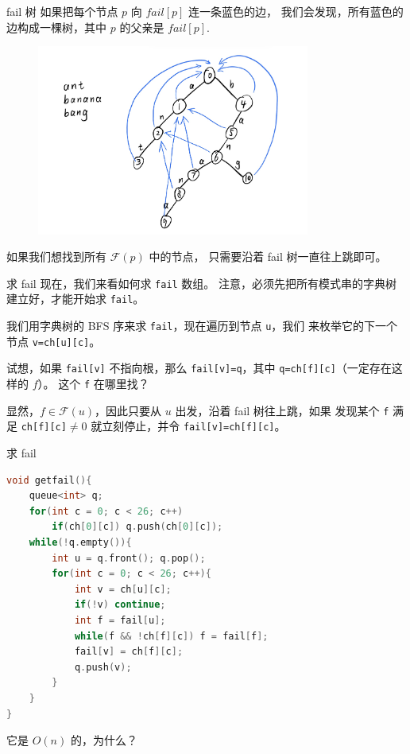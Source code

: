 \documentclass{beamer}
\begin{document}
\begin{frame}[fragile]{fail 树}
    \small
    如果把每个节点 $p$ 向 $fail[p]$ 连一条蓝色的边，
    我们会发现，所有蓝色的边构成一棵树，其中 $p$ 的父亲是 $fail[p]$.

    \begin{figure}[H]
        \centering
        \includegraphics[width=0.8\textwidth]{pic/fail.jpg}
    \end{figure}

    \vspace{1em}\pause
    如果我们想找到所有 $\mathcal{F}(p)$ 中的节点，
    只需要沿着 fail 树一直往上跳即可。
\end{frame}

\begin{frame}[fragile]{求 fail}
    \small
    现在，我们来看如何求 \verb|fail| 数组。
    注意，必须先把所有模式串的字典树建立好，才能开始求 \verb|fail|。

    \vspace{1em}\pause
    我们用字典树的 BFS 序来求 \verb|fail|，现在遍历到节点 \verb|u|，我们
    来枚举它的下一个节点 \verb|v=ch[u][c]|。
    
    \vspace{1em}\pause
    试想，如果 \verb|fail[v]| 不指向根，那么 \verb|fail[v]=q|，其中 \verb|q=ch[f][c]|（一定存在这样的 $f$）。
    这个 \verb|f| 在哪里找？

    \vspace{1em}\pause
    显然，$f\in \mathcal{F}(u)$，因此只要从 $u$ 出发，沿着 fail 树往上跳，如果
    发现某个 \verb|f| 满足 \verb|ch[f][c]|$\neq 0$ 就立刻停止，并令 \verb|fail[v]=ch[f][c]|。
\end{frame}

\begin{frame}[fragile]{求 fail}
    \small
    \begin{lstlisting}[language=c++]
void getfail(){
    queue<int> q;
    for(int c = 0; c < 26; c++)
        if(ch[0][c]) q.push(ch[0][c]);
    while(!q.empty()){
        int u = q.front(); q.pop();
        for(int c = 0; c < 26; c++){
            int v = ch[u][c];
            if(!v) continue;
            int f = fail[u];
            while(f && !ch[f][c]) f = fail[f];
            fail[v] = ch[f][c];
            q.push(v);
        }
    }
}
    \end{lstlisting}

    它是 $O(n)$ 的，为什么？
\end{frame}
\end{document}
